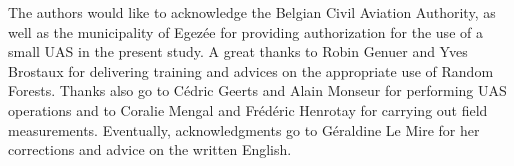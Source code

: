 \documentclass[remotesensing,article,submit,moreauthors,pdftex,12pt,a4paper]{mdpi} %
\begin{document}
The authors would like to acknowledge the Belgian Civil Aviation Authority, as well as the municipality of Egezée for providing authorization for the use of a small UAS in the present study. A great thanks to Robin Genuer and Yves Brostaux for delivering training and advices on the appropriate use of Random Forests. Thanks also go to C\'edric Geerts and Alain Monseur for performing UAS operations and to Coralie Mengal and Fr\'ed\'eric Henrotay for carrying out field measurements. Eventually, acknowledgments go to G\'eraldine Le Mire %
for her corrections and advice on the written English.



\makeatletter
\renewcommand\@biblabel[1]{#1. }
\makeatother


\end{document}
